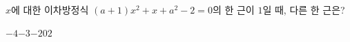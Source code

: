 $x$에 대한 이차방정식 $(a+1)x^2+x+a^2-2=0$의 한 근이 $1$일 때, 다른 한 근은? 
\begin{choices32}{$-4$}{$-3$}{$-2$}{$0$}{$2$}\end{choices32}
